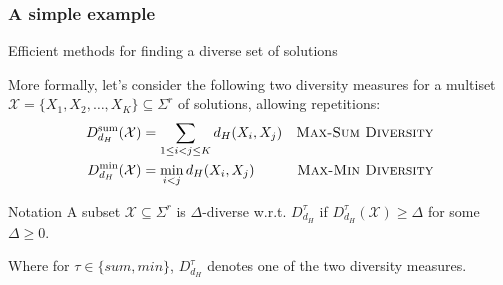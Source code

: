 \documentclass{beamer}
\begin{document}
\begin{frame}
    \frametitle{A simple example}
    \begin{table}[h!]
        \centering
        \caption{Longest common subsequences of two input strings $X=ABABCDDEE$ and $Y=ABCBAEEDD.$ over $\Sigma = \{A, B, C, D, E\}$}
    \end{table}

\end{frame}




\begin{frame}{Efficient methods for finding a diverse set of solutions}

    More formally, let's consider the following two diversity measures for a multiset $\mathcal{X} = \{X_1, X_2, \ldots, X_K\} \subseteq \Sigma^r$ of solutions, allowing repetitions:
    \begin{align}
        D_{d_H}^{\text{sum}} (\mathcal{X}) & = \sum_{1 \leq i < j \leq K} d_H(X_i, X_j) & \text{\textsc{Max-Sum Diversity}} \\
        D_{d_H}^{\text{min}} (\mathcal{X}) & = \min_{i < j} d_H(X_i, X_j)               & \text{\textsc{Max-Min Diversity}}
    \end{align}

    \begin{block}{Notation}
        A subset $\mathcal{X} \subseteq \Sigma^r$ is $\Delta$-diverse w.r.t. $D_{d_H}^{\tau}$ if $D_{d_H}^{\tau}(\mathcal{X}) \geq \Delta$ for some $\Delta \geq 0$.
    \end{block}
    Where for $\tau \in \{sum, min\}$, $D_{d_H}^{\tau}$ denotes one of the two diversity measures.
\end{frame}
\end{document}
